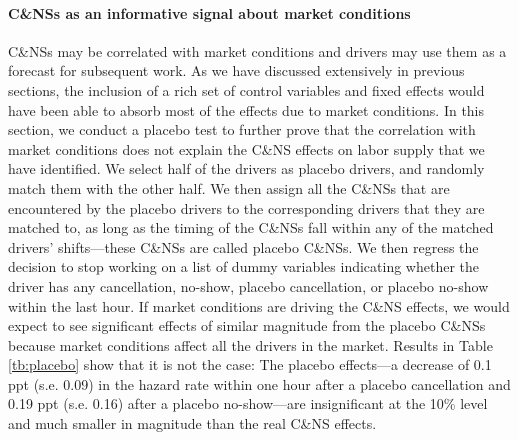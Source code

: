 \documentclass[reviewmode]{restud}
\begin{document}
\paragraph{C\&NSs as an informative signal about market conditions} C\&NSs may be correlated with market conditions and drivers may use them as a forecast for subsequent work. As we have discussed extensively in previous sections, the inclusion of a rich set of control variables and fixed effects would have been able to absorb most of the effects due to market conditions. In this section, we conduct a placebo test to further prove that the correlation with market conditions does not explain the C\&NS effects on labor supply that we have identified. We select half of the drivers as placebo drivers, and randomly match them with the other half. We then assign all the C\&NSs that are encountered by the placebo drivers to the corresponding drivers that they are matched to, as long as the timing of the C\&NSs fall within any of the matched drivers' shifts---these C\&NSs are called placebo C\&NSs. We then regress the decision to stop working on a list of dummy variables indicating whether the driver has any cancellation, no-show, placebo cancellation, or placebo no-show within the last hour. If market conditions are driving the C\&NS effects, we would expect to see significant effects of similar magnitude from the placebo C\&NSs because market conditions affect all the drivers in the market. Results in Table \ref{tb:placebo} show that it is not the case: The placebo effects---a decrease of 0.1 ppt (s.e. 0.09) in the hazard rate within one hour after a placebo cancellation and 0.19 ppt (s.e. 0.16) after a placebo no-show---are insignificant at the 10\% level and much smaller in magnitude than the real C\&NS effects.


\end{document}
